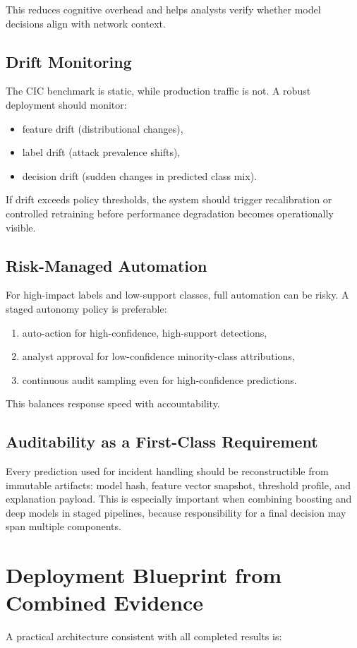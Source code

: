 \documentclass[10pt,journal]{IEEEtran}
\begin{document}
This reduces cognitive overhead and helps analysts verify whether model decisions align with network context.

\subsection{Drift Monitoring}
The CIC benchmark is static, while production traffic is not. A robust deployment should monitor:
\begin{itemize}
\item feature drift (distributional changes),
\item label drift (attack prevalence shifts),
\item decision drift (sudden changes in predicted class mix).
\end{itemize}

If drift exceeds policy thresholds, the system should trigger recalibration or controlled retraining before performance degradation becomes operationally visible.

\subsection{Risk-Managed Automation}
For high-impact labels and low-support classes, full automation can be risky. A staged autonomy policy is preferable:
\begin{enumerate}
\item auto-action for high-confidence, high-support detections,
\item analyst approval for low-confidence minority-class attributions,
\item continuous audit sampling even for high-confidence predictions.
\end{enumerate}

This balances response speed with accountability.

\subsection{Auditability as a First-Class Requirement}
Every prediction used for incident handling should be reconstructible from immutable artifacts: model hash, feature vector snapshot, threshold profile, and explanation payload. This is especially important when combining boosting and deep models in staged pipelines, because responsibility for a final decision may span multiple components.

\section{Deployment Blueprint from Combined Evidence}
A practical architecture consistent with all completed results is:
\end{document}
